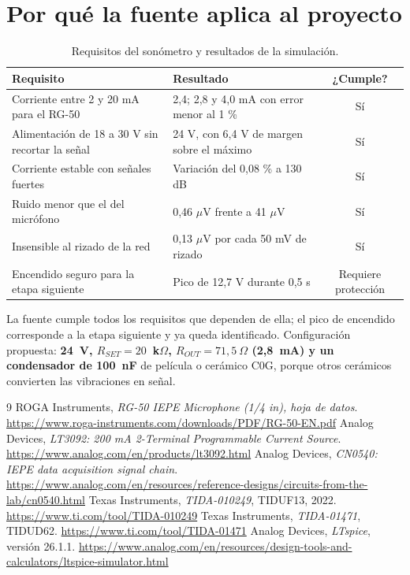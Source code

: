 \documentclass[10pt,a4paper]{article}
\begin{document}
\section{Por qué la fuente aplica al proyecto}

\begin{table}[H]
\centering
\small
\caption{Requisitos del sonómetro y resultados de la simulación.}
\label{tab:resumen}
\begin{tabular}{p{6.6cm}p{6.4cm}c}
\toprule
Requisito & Resultado & ¿Cumple? \\
\midrule
Corriente entre 2 y 20 mA para el RG-50 & 2,4; 2,8 y 4,0 mA con error menor al 1 \% & Sí \\
Alimentación de 18 a 30 V sin recortar la señal & 24 V, con 6,4 V de margen sobre el máximo & Sí \\
Corriente estable con señales fuertes & Variación del 0,08 \% a 130 dB & Sí \\
Ruido menor que el del micrófono & 0,46 $\mu$V frente a 41 $\mu$V & Sí \\
Insensible al rizado de la red & 0,13 $\mu$V por cada 50 mV de rizado & Sí \\
Encendido seguro para la etapa siguiente & Pico de 12,7 V durante 0,5 s & Requiere protección \\
\bottomrule
\end{tabular}
\end{table}

La fuente cumple todos los requisitos que dependen de ella; el pico de encendido corresponde a la etapa siguiente y ya queda identificado. Configuración propuesta: \textbf{24~V, $R_{SET} = 20$~k$\Omega$, $R_{OUT} = 71{,}5~\Omega$ (2,8~mA) y un condensador de 100~nF} de película o cerámico C0G, porque otros cerámicos convierten las vibraciones en señal.

{\small
\begin{thebibliography}{9}
\setlength{\itemsep}{0pt}
 ROGA Instruments, \emph{RG-50 IEPE Microphone (1/4 in), hoja de datos}. \url{https://www.roga-instruments.com/downloads/PDF/RG-50-EN.pdf}
 Analog Devices, \emph{LT3092: 200 mA 2-Terminal Programmable Current Source}. \url{https://www.analog.com/en/products/lt3092.html}
 Analog Devices, \emph{CN0540: IEPE data acquisition signal chain}. \url{https://www.analog.com/en/resources/reference-designs/circuits-from-the-lab/cn0540.html}
 Texas Instruments, \emph{TIDA-010249}, TIDUF13, 2022. \url{https://www.ti.com/tool/TIDA-010249}
 Texas Instruments, \emph{TIDA-01471}, TIDUD62. \url{https://www.ti.com/tool/TIDA-01471}
 Analog Devices, \emph{LTspice}, versión 26.1.1. \url{https://www.analog.com/en/resources/design-tools-and-calculators/ltspice-simulator.html}
\end{thebibliography}
}
\end{document}
